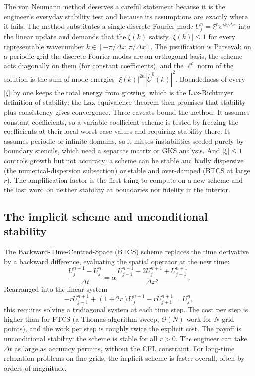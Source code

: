 \begin{mastery}
The von Neumann method deserves a careful statement because it is
the engineer's everyday stability test and because its assumptions
are exactly where it fails. The method substitutes a single discrete
Fourier mode $U_{j}^{n} = \xi^{n} e^{i k j \Delta x}$ into the
linear update and demands that the 
$\xi(k)$ satisfy $|\xi(k)| \leq 1$ for every representable
wavenumber $k \in [-\pi/\Delta x, \pi/\Delta x]$. The justification
is Parseval: on a periodic grid the discrete Fourier modes are an
orthogonal basis, the scheme acts diagonally on them (for constant
coefficients), and the $\ell^{2}$ norm of the solution is the sum of
mode energies $|\xi(k)|^{2n}|\hat{U}^{0}(k)|^{2}$. Boundedness of
every $|\xi|$ by one keeps the total energy from growing, which is
the Lax-Richtmyer definition of stability; the Lax equivalence
theorem then promises that stability plus consistency gives
convergence. Three caveats bound the method. It assumes constant
coefficients, so a variable-coefficient scheme is tested by freezing
the coefficients at their local worst-case values and requiring
stability there. It assumes periodic or infinite domains, so it
misses instabilities seeded purely by boundary stencils, which need
a separate matrix or GKS analysis. And $|\xi| \leq 1$ controls
growth but not accuracy: a scheme can be stable and badly
dispersive (the numerical-dispersion subsection) or stable and
over-damped (BTCS at large $r$). The amplification factor is the
first thing to compute on a new scheme and the last word on neither
stability at boundaries nor fidelity in the interior.
\end{mastery}

\subsection{The implicit scheme and unconditional stability}

The Backward-Time-Centred-Space (BTCS) scheme replaces the time
derivative by a backward difference, evaluating the spatial
operator at the new time:
\[
\frac{U_{j}^{n+1} - U_{j}^{n}}{\Delta t} = \alpha\, \frac{U_{j+1}^{n+1} - 2 U_{j}^{n+1} + U_{j-1}^{n+1}}{\Delta x^{2}}.
\]
Rearranged into the linear system
\[
-r U_{j-1}^{n+1} + (1 + 2 r) U_{j}^{n+1} - r U_{j+1}^{n+1} = U_{j}^{n},
\]
this requires solving a tridiagonal system at each time step. The
cost per step is higher than for FTCS (a Thomas-algorithm sweep,
$\mathcal{O}(N)$ work for $N$ grid points), and the work per
step is roughly twice the explicit cost. The payoff is
unconditional stability: the scheme is stable for all $r > 0$.
The engineer can take $\Delta t$ as large as accuracy permits,
without the CFL constraint. For long-time relaxation problems on
fine grids, the implicit scheme is faster overall, often by
orders of magnitude.

